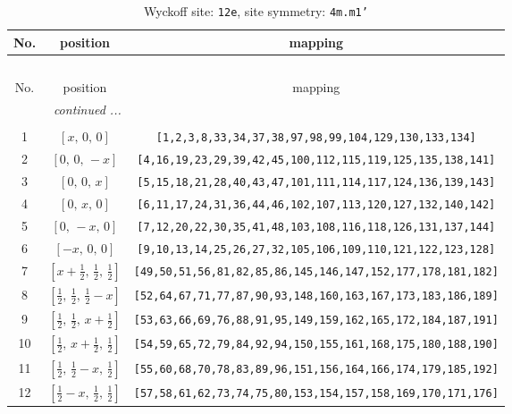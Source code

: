 \documentclass[fleqn,8pt]{jsarticle}
\begin{document}
\renewcommand{\arraystretch}{1.2}
\begin{longtable}{ccc}
\caption{Wyckoff site: {\tt 12e}, site symmetry: {\tt 4m.m1'}}
 \\
 \hline \hline
No. & position & mapping \\ \hline \endfirsthead

\multicolumn{2}{l}{\tablename\ \thetable{}} \\
 \hline \hline
No. & position & mapping \\ \hline \endhead

 \hline \hline
\multicolumn{2}{r}{\footnotesize\it continued ...} \\ \endfoot

 \hline \hline
\multicolumn{2}{r}{} \\ \endlastfoot

1 & $\left[ x,\, 0,\, 0 \right]$ & {\tt [1,2,3,8,33,34,37,38,97,98,99,104,129,130,133,134]} \\ \hline
2 & $\left[ 0,\, 0,\, - x \right]$ & {\tt [4,16,19,23,29,39,42,45,100,112,115,119,125,135,138,141]} \\ \hline
3 & $\left[ 0,\, 0,\, x \right]$ & {\tt [5,15,18,21,28,40,43,47,101,111,114,117,124,136,139,143]} \\ \hline
4 & $\left[ 0,\, x,\, 0 \right]$ & {\tt [6,11,17,24,31,36,44,46,102,107,113,120,127,132,140,142]} \\ \hline
5 & $\left[ 0,\, - x,\, 0 \right]$ & {\tt [7,12,20,22,30,35,41,48,103,108,116,118,126,131,137,144]} \\ \hline
6 & $\left[ - x,\, 0,\, 0 \right]$ & {\tt [9,10,13,14,25,26,27,32,105,106,109,110,121,122,123,128]} \\ \hline
7 & $\left[ x + \frac{1}{2},\, \frac{1}{2},\, \frac{1}{2} \right]$ & {\tt [49,50,51,56,81,82,85,86,145,146,147,152,177,178,181,182]} \\ \hline
8 & $\left[ \frac{1}{2},\, \frac{1}{2},\, \frac{1}{2} - x \right]$ & {\tt [52,64,67,71,77,87,90,93,148,160,163,167,173,183,186,189]} \\ \hline
9 & $\left[ \frac{1}{2},\, \frac{1}{2},\, x + \frac{1}{2} \right]$ & {\tt [53,63,66,69,76,88,91,95,149,159,162,165,172,184,187,191]} \\ \hline
10 & $\left[ \frac{1}{2},\, x + \frac{1}{2},\, \frac{1}{2} \right]$ & {\tt [54,59,65,72,79,84,92,94,150,155,161,168,175,180,188,190]} \\ \hline
11 & $\left[ \frac{1}{2},\, \frac{1}{2} - x,\, \frac{1}{2} \right]$ & {\tt [55,60,68,70,78,83,89,96,151,156,164,166,174,179,185,192]} \\ \hline
12 & $\left[ \frac{1}{2} - x,\, \frac{1}{2},\, \frac{1}{2} \right]$ & {\tt [57,58,61,62,73,74,75,80,153,154,157,158,169,170,171,176]} \\
\end{longtable}
\end{document}
